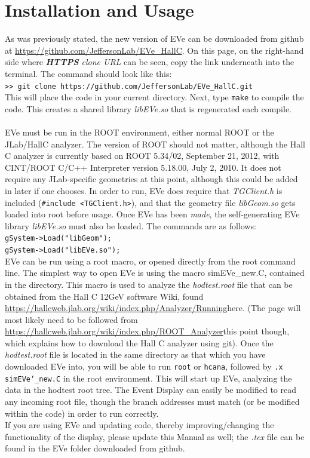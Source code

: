 \documentclass[12pt]{article}
\numberwithin{equation}{section}
\begin{document}
\section{Installation and Usage}
As was previously stated, the new version of EVe can be downloaded from github at \url{https://github.com/JeffersonLab/EVe\_HallC}. On this page, on the right-hand side where \textit{\textbf{HTTPS} clone URL} can be seen, copy the link underneath into the terminal. The command should look like this:
\\
\texttt{>> git clone https://github.com/JeffersonLab/EVe\_HallC.git }
\\
This will place the code in your current directory. Next, type \texttt{make} to compile the code. This creates a shared library \textit{libEVe.so} that is regenerated each compile. 
\\
\\
EVe must be run in the ROOT environment, either normal ROOT or the JLab/HallC analyzer. The version of ROOT should not matter, although the Hall C analyzer is currently based on ROOT 5.34/02, September 21, 2012, with CINT/ROOT C/C++ Interpreter version 5.18.00, July 2, 2010. It does not require any JLab-specific geometries at this point, although this could be added in later if one chooses. In order to run, EVe does require that \textit{TGClient.h} is included (\texttt{\#include <TGClient.h>}), and that the geometry file \textit{libGeom.so} gets loaded into root before usage. Once EVe has been \textit{made}, the self-generating EVe library \textit{libEVe.so} must also be loaded. The commands are as follows:
\\
\texttt{gSystem->Load("libGeom");} \\
\texttt{gSystem->Load("libEVe.so");}
\\
EVe can be run using a root macro, or opened directly from the root command line. The simplest way to open EVe is using the macro simEVe\_new.C, contained in the directory. This macro is used to analyze the \textit{hodtest.root} file that can be obtained from the Hall C 12GeV software Wiki, found \url{https://hallcweb.jlab.org/wiki/index.php/Analyzer/Running}{here}. (The page will most likely need to be followed from \url{https://hallcweb.jlab.org/wiki/index.php/ROOT_Analyzer}{this point} though, which explains how to download the Hall C analyzer using git). Once the \textit{hodtest.root} file is located in the same directory as that which you have downloaded EVe into, you will be able to run \texttt{root} or \texttt{hcana}, followed by \texttt{.x simEVe\char`_new.C} in the root environment. This will start up EVe, analyzing the data in the hodtest root tree. The Event Display can easily be modified to read any incoming root file, though the branch addresses must match (or be modified within the code) in order to run correctly.
\\
If you are using EVe and updating code, thereby improving/changing the functionality of the display, please update this Manual as well; the \textit{.tex} file can be found in the EVe folder downloaded from github.
\end{document}
